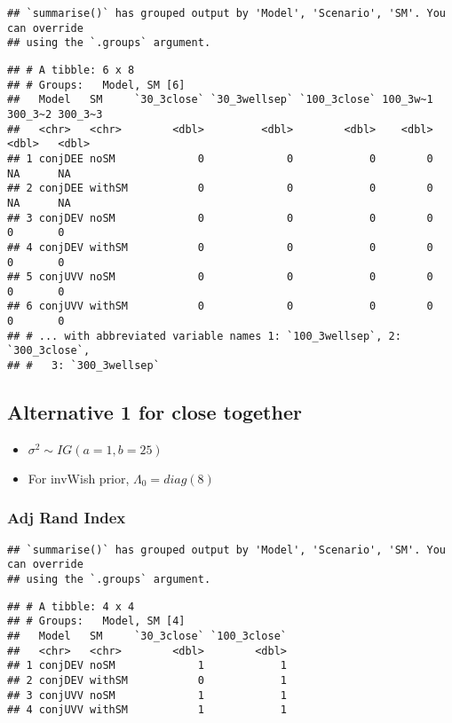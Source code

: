 \documentclass[
]{article}
\providecommand{\tightlist}{%
  \setlength{\itemsep}{0pt}\setlength{\parskip}{0pt}}
\begin{document}
\begin{verbatim}
## `summarise()` has grouped output by 'Model', 'Scenario', 'SM'. You can override
## using the `.groups` argument.
\end{verbatim}

\begin{verbatim}
## # A tibble: 6 x 8
## # Groups:   Model, SM [6]
##   Model   SM     `30_3close` `30_3wellsep` `100_3close` 100_3w~1 300_3~2 300_3~3
##   <chr>   <chr>        <dbl>         <dbl>        <dbl>    <dbl>   <dbl>   <dbl>
## 1 conjDEE noSM             0             0            0        0      NA      NA
## 2 conjDEE withSM           0             0            0        0      NA      NA
## 3 conjDEV noSM             0             0            0        0       0       0
## 4 conjDEV withSM           0             0            0        0       0       0
## 5 conjUVV noSM             0             0            0        0       0       0
## 6 conjUVV withSM           0             0            0        0       0       0
## # ... with abbreviated variable names 1: `100_3wellsep`, 2: `300_3close`,
## #   3: `300_3wellsep`
\end{verbatim}

\hypertarget{alternative-1-for-close-together}{%
\subsection{Alternative 1 for close
together}\label{alternative-1-for-close-together}}

\begin{itemize}
\tightlist
\item
  \(\sigma^2 \sim IG(a=1, b=25)\)
\item
  For invWish prior, \(\Lambda_0 = diag(8)\)
\end{itemize}

\hypertarget{adj-rand-index-1}{%
\subsubsection{Adj Rand Index}\label{adj-rand-index-1}}

\begin{verbatim}
## `summarise()` has grouped output by 'Model', 'Scenario', 'SM'. You can override
## using the `.groups` argument.
\end{verbatim}

\begin{verbatim}
## # A tibble: 4 x 4
## # Groups:   Model, SM [4]
##   Model   SM     `30_3close` `100_3close`
##   <chr>   <chr>        <dbl>        <dbl>
## 1 conjDEV noSM             1            1
## 2 conjDEV withSM           0            1
## 3 conjUVV noSM             1            1
## 4 conjUVV withSM           1            1
\end{verbatim}
\end{document}
